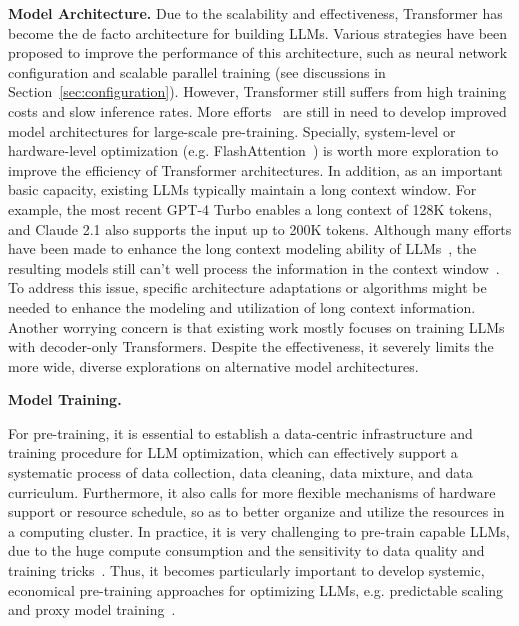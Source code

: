 \textbf{Model Architecture.} Due to the scalability and effectiveness, Transformer has become the de facto architecture for building LLMs. Various strategies have been proposed to improve the performance of this architecture, such as  neural network configuration  and scalable parallel  training (see discussions in Section~\ref{sec:configuration}).   
However, Transformer still suffers from  high training  costs and slow inference rates. More efforts~\cite{peng-2023-arxiv-rwkv,sun-2023-arxiv-retnet} are still in need to develop improved model architectures  for large-scale pre-training. Specially, system-level or hardware-level optimization (e.g. FlashAttention~\cite{Dao-2023-arxiv-flashattention2}) is worth more  exploration to improve the efficiency of Transformer architectures. In addition, as an important basic  capacity, existing LLMs typically maintain a long context window. For example, the most recent GPT-4 Turbo enables a long context of  128K tokens, and Claude 2.1 also supports the input up to 200K tokens. Although many efforts have been made to enhance  the long context modeling ability of LLMs~\cite{su-online-2023-Rerope,Press-ICLR-2022-Train}, the resulting models still can't well process the information in the context window~\cite{Liu-arxiv-2023-Lost}. To address this issue, specific architecture adaptations or algorithms might be needed to enhance the modeling and utilization  of long context information.  Another worrying concern is that existing work mostly focuses on training LLMs with decoder-only Transformers. Despite the effectiveness, it severely limits the more wide, diverse explorations on alternative model architectures. 

\textbf{Model Training.} 

For pre-training, it is essential to establish a data-centric infrastructure and training procedure for LLM optimization, which can effectively support a systematic process of data collection, data cleaning, data mixture, and data  curriculum. Furthermore, it also calls for more flexible mechanisms of hardware support or resource schedule, so as to better organize and utilize the resources in a computing cluster. In  practice, it is very  challenging to pre-train capable LLMs, due to the huge compute consumption and the sensitivity to data quality and  training tricks~\cite{Zeng-arxiv-2022-GLM,Scao-arxiv-2022-BLOOM}. Thus, it becomes particularly important to develop systemic, economical pre-training approaches for optimizing LLMs, e.g. predictable scaling~\cite{OpenAI-OpenAI-2023-GPT-4} and proxy model training~\cite{Xie-arxiv-2023-doremi}.  

